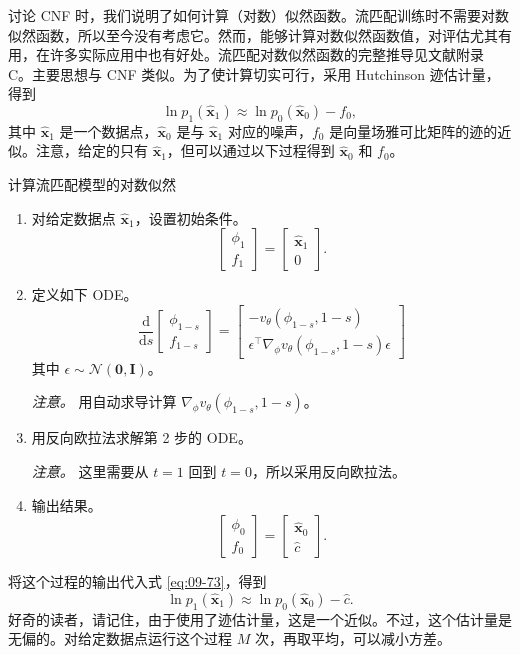 讨论 CNF 时，我们说明了如何计算（对数）似然函数。流匹配训练时不需要对数似然函数，所以至今没有考虑它。然而，能够计算对数似然函数值，对评估尤其有用，在许多实际应用中也有好处。流匹配对数似然函数的完整推导见文献附录 C。主要思想与 CNF 类似。为了使计算切实可行，采用 Hutchinson 迹估计量，得到
\begin{equation}
  \ln p_1(\hat{\mathbf x}_1)\approx\ln p_0(\hat{\mathbf x}_0)-f_0,
  \tag{9.73}\label{eq:09-73}
\end{equation}
其中 $\hat{\mathbf x}_1$ 是一个数据点，$\hat{\mathbf x}_0$ 是与 $\hat{\mathbf x}_1$ 对应的噪声，$f_0$ 是向量场雅可比矩阵的迹的近似。注意，给定的只有 $\hat{\mathbf x}_1$，但可以通过以下过程得到 $\hat{\mathbf x}_0$ 和 $f_0$。
\begin{booknote}[colframe=blue!65!black,colback=blue!4]{计算流匹配模型的对数似然}
  \begin{enumerate}
    \item 对给定数据点 $\hat{\mathbf x}_1$，设置初始条件。
    \[
      \begin{bmatrix}\phi_1\\f_1\end{bmatrix}
      =\begin{bmatrix}\hat{\mathbf x}_1\\0\end{bmatrix}.
    \]
    \item 定义如下 ODE。
    \[
      \frac{\mathrm d}{\mathrm ds}
      \begin{bmatrix}\phi_{1-s}\\f_{1-s}\end{bmatrix}
      =\begin{bmatrix}
        -v_\theta(\phi_{1-s},1-s)\\
        \epsilon^\top\nabla_\phi v_\theta(\phi_{1-s},1-s)\epsilon
      \end{bmatrix}
    \]
    其中 $\epsilon\sim\mathcal N(\mathbf 0,\mathbf I)$。

    \emph{注意。} 用自动求导计算 $\nabla_\phi v_\theta(\phi_{1-s},1-s)$。
    \item 用反向欧拉法求解第 2 步的 ODE。

    \emph{注意。} 这里需要从 $t=1$ 回到 $t=0$，所以采用反向欧拉法。
    \item 输出结果。
    \[
      \begin{bmatrix}\phi_0\\f_0\end{bmatrix}
      =\begin{bmatrix}\hat{\mathbf x}_0\\\hat c\end{bmatrix}.
    \]
  \end{enumerate}
\end{booknote}
将这个过程的输出代入式 \eqref{eq:09-73}，得到
\begin{equation}
  \ln p_1(\hat{\mathbf x}_1)\approx\ln p_0(\hat{\mathbf x}_0)-\hat c.
  \tag{9.74}\label{eq:09-74}
\end{equation}
好奇的读者，请记住，由于使用了迹估计量，这是一个近似。不过，这个估计量是无偏的。对给定数据点运行这个过程 $M$ 次，再取平均，可以减小方差。

